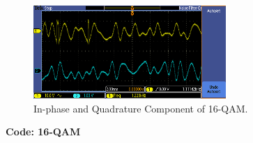 \documentclass{article}
\begin{document}
\\

\begin{figure}[h]
  \begin{center}
    \includegraphics[width=0.65\textwidth]{img/task_d_oscilloscope.png}
    \caption{In-phase and Quadrature Component of 16-QAM.}
  \end{center}
\end{figure}
\textbf{Code: 16-QAM}
\end{document}
